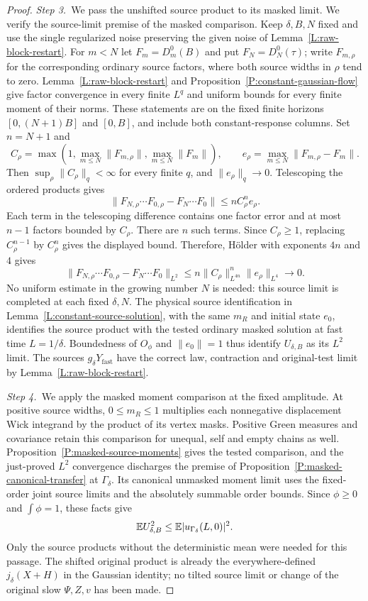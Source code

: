 \begin{proof}
  \medskip
  \noindent\textit{Step 3.~}We pass the unshifted source product to its masked
  limit.
  We verify the source-limit premise of the masked comparison. Keep $\delta,B,N$
  fixed and use the single regularized noise preserving the given noise of
  Lemma~\ref{L:raw-block-restart}. For $m < N$ let $F_m = D_m^0(B)$ and put $F_N
  = D_N^0(\tau)$; write $F_{m,\rho}$ for the corresponding ordinary source
  factors, where both source widths in $\rho$ tend to zero.
  Lemma~\ref{L:raw-block-restart} and Proposition~\ref{P:constant-gaussian-flow}
  give factor convergence in every finite $L^q$ and uniform bounds for every
  finite moment of their norms. These statements are on the fixed finite
  horizons $[0,(N+1)B]$ and $[0,B]$, and include both constant-response columns.
  Set $n = N+1$ and
  \[
    C_\rho=\max\left(1,\max_{m\le N}\|F_{m,\rho}\|,
    \max_{m\le N}\|F_m\|\right),\qquad
    e_\rho=\max_{m\le N}\|F_{m,\rho}-F_m\|.
  \]
  Then $\sup_\rho\|C_\rho\|_q < \infty$ for every finite $q$, and $\|e_\rho\|_q
  \to 0$. Telescoping the ordered products gives
  \[
    \|F_{N,\rho}\cdots F_{0,\rho}-F_N\cdots F_0\|
    \le n C_\rho^n e_\rho.
  \]
  Each term in the telescoping difference contains one factor error and at
  most $n-1$ factors bounded by $C_\rho$. There are $n$ such terms. Since
  $C_\rho\ge1$, replacing $C_\rho^{n-1}$ by $C_\rho^n$ gives the displayed
  bound.
  Therefore, H\"older with exponents $4n$ and $4$ gives
  \[
    \big\|F_{N,\rho}\cdots F_{0,\rho}-F_N\cdots F_0\big\|_{L^2}
    \le n\|C_\rho\|_{L^{4n}}^n\|e_\rho\|_{L^4}
    \longrightarrow0.
  \]
  No uniform estimate in the growing number $N$ is needed: this source limit is
  completed at each fixed $\delta,N$. The physical source identification in
  Lemma~\ref{L:constant-source-solution}, with the same $m_R$ and initial state
  $e_0$, identifies the source product with the tested ordinary masked solution
  at fast time $L = 1/\delta$. Boundedness of $O_\phi$ and $\|e_0\| = 1$ thus
  identify $U_{\delta,B}$ as its $L^2$ limit. The sources $g_\delta
  Y_{\mathrm{fast}}$ have the correct law, contraction and original-test limit
  by Lemma~\ref{L:raw-block-restart}.


  \medskip
  \noindent\textit{Step 4.~}We apply the masked moment comparison at the fixed
  amplitude.
  At positive source widths, $0 \le m_R \le 1$ multiplies each nonnegative
  displacement Wick integrand by the product of its vertex masks. Positive Green
  measures and covariance retain this comparison for unequal, self and empty
  chains as well. Proposition~\ref{P:masked-source-moments} gives the tested
  comparison, and the just-proved $L^2$ convergence discharges the premise of
  Proposition~\ref{P:masked-canonical-transfer} at $\Gamma_\delta$. Its
  canonical unmasked moment limit uses the fixed-order joint source limits and
  the absolutely summable order bounds. Since $\phi \ge 0$ and $\int\phi = 1$,
  these facts give
  \[
    \mathbb{E} U_{\delta,B}^2
    \le\mathbb{E}|u_{\Gamma_\delta}(L,0)|^2.
  \]
  Only the source products without the deterministic mean were needed for this
  passage. The shifted original product is already the everywhere-defined
  $j_\delta(X+H)$ in the Gaussian identity; no tilted source limit or change of
  the original slow $\Psi,Z,v$ has been made.



\end{proof}
